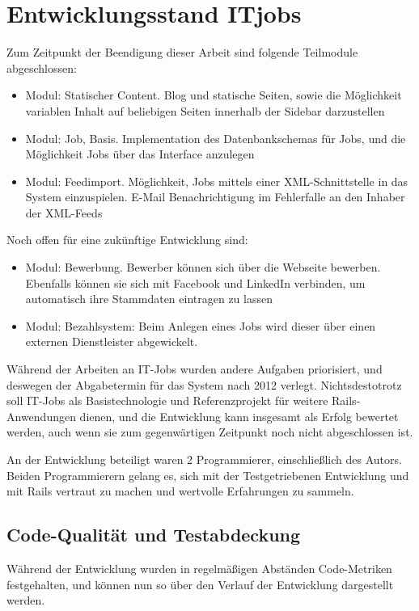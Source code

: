 \section{Entwicklungsstand ITjobs}
Zum Zeitpunkt der Beendigung dieser Arbeit sind folgende Teilmodule abgeschlossen:
\begin{itemize}
 \item Modul: Statischer Content. Blog und statische Seiten, sowie die Möglichkeit variablen Inhalt auf beliebigen Seiten innerhalb der Sidebar darzustellen
 \item Modul: Job, Basis. Implementation des Datenbankschemas für Jobs, und die Möglichkeit Jobs über das Interface anzulegen
 \item Modul: Feedimport. Möglichkeit, Jobs mittels einer XML-Schnittstelle in das System einzuspielen. E-Mail Benachrichtigung im Fehlerfalle an den Inhaber der XML-Feeds
\end{itemize}
Noch offen für eine zukünftige Entwicklung sind:
\begin{itemize}
 \item Modul: Bewerbung. Bewerber können sich über die Webseite bewerben. Ebenfalls können sie sich mit Facebook und LinkedIn verbinden, um automatisch ihre Stammdaten eintragen zu lassen
 \item Modul: Bezahlsystem: Beim Anlegen eines Jobs wird dieser über einen externen Dienstleister abgewickelt.
\end{itemize}

Während der Arbeiten an IT-Jobs wurden andere Aufgaben priorisiert, und deswegen der Abgabetermin für das System nach 2012 verlegt. Nichtsdestotrotz soll IT-Jobs als Basistechnologie und Referenzprojekt für weitere Rails-Anwendungen dienen, und die Entwicklung kann insgesamt als Erfolg bewertet werden, auch wenn sie zum gegenwärtigen Zeitpunkt noch nicht abgeschlossen ist.

An der Entwicklung beteiligt waren 2 Programmierer, einschließlich des Autors. Beiden Programmierern gelang es, sich mit der Testgetriebenen Entwicklung und mit Rails vertraut zu machen und wertvolle Erfahrungen zu sammeln. 

\subsection*{Code-Qualität und Testabdeckung}
Während der Entwicklung wurden in regelmäßigen Abständen Code-Metriken festgehalten, und können nun so über den Verlauf der Entwicklung dargestellt werden. 

